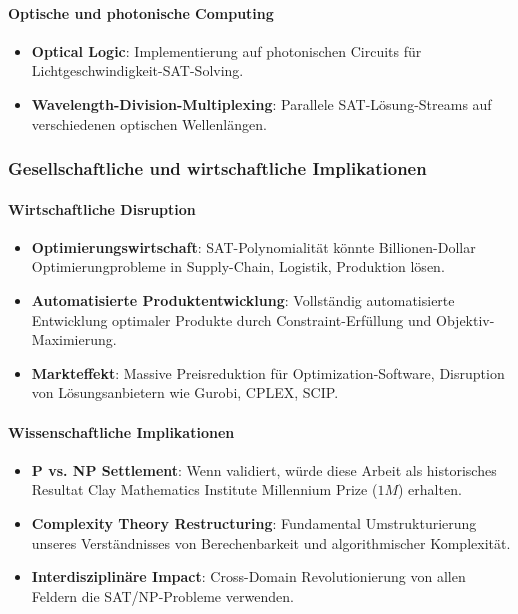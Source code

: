 ﻿\documentclass[a4paper,12pt]{article}
\theoremstyle{definition}
\begin{document}
\paragraph{Optische und photonische Computing}

\begin{itemize}
	\item \textbf{Optical Logic}: Implementierung auf photonischen Circuits für Lichtgeschwindigkeit-SAT-Solving.
	
	\item \textbf{Wavelength-Division-Multiplexing}: Parallele SAT-Lösung-Streams auf verschiedenen optischen Wellenlängen.
\end{itemize}

\subsubsection{Gesellschaftliche und wirtschaftliche Implikationen}

\paragraph{Wirtschaftliche Disruption}

\begin{itemize}
	\item \textbf{Optimierungswirtschaft}: SAT-Polynomialität könnte Billionen-Dollar Optimierungprobleme in Supply-Chain, Logistik, Produktion lösen.
	
	\item \textbf{Automatisierte Produktentwicklung}: Vollständig automatisierte Entwicklung optimaler Produkte durch Constraint-Erfüllung und Objektiv-Maximierung.
	
	\item \textbf{Markteffekt}: Massive Preisreduktion für Optimization-Software, Disruption von Lösungsanbietern wie Gurobi, CPLEX, SCIP.
\end{itemize}

\paragraph{Wissenschaftliche Implikationen}

\begin{itemize}
	\item \textbf{P vs. NP Settlement}: Wenn validiert, würde diese Arbeit als historisches Resultat Clay Mathematics Institute Millennium Prize ($1M$) erhalten.
	
	\item \textbf{Complexity Theory Restructuring}: Fundamental Umstrukturierung unseres Verständnisses von Berechenbarkeit und algorithmischer Komplexität.
	
	\item \textbf{Interdisziplinäre Impact}: Cross-Domain Revolutionierung von allen Feldern die SAT/NP-Probleme verwenden.
\end{itemize}
\end{document}
